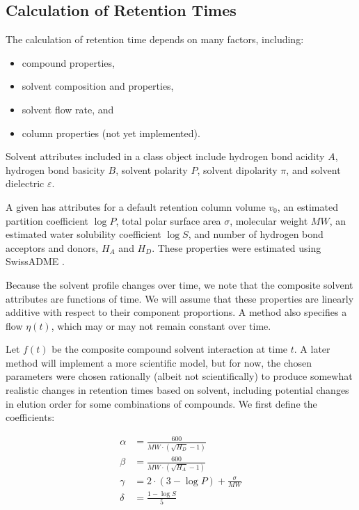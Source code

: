 \documentclass{article}
\newcommand{\cbtt}[1]{\textcolor{codepurple}{\fontseries{b}\selectfont{\texttt{#1}}}}
\begin{document}
\subsection{Calculation of Retention Times}\label{sec:calcret}
The calculation of retention time depends on many factors, including:
\begin{itemize}
\item compound properties,
\item solvent composition and properties,
\item solvent flow rate, and
\item column properties (not yet implemented).
\end{itemize}

Solvent attributes included in a \cbtt{Solvent} class object include hydrogen bond acidity $A$, hydrogen bond basicity $B$, solvent polarity $P$, solvent dipolarity $\pi$, and solvent dielectric $\varepsilon$. 

A given \cbtt{Compound} has attributes for a default retention column volume $v_0$, an estimated partition coefficient $\log P$, total polar surface area $\sigma$, molecular weight $MW$, an estimated water solubility coefficient $\log S$, and number of hydrogen bond acceptors and donors, $H_A$ and $H_D$. These properties were estimated using SwissADME \cite{swissadme}.

Because the solvent profile  changes over time, we note that the composite solvent attributes are functions of time. We will assume that these properties are linearly additive with respect to their component proportions. A method also specifies a flow $\eta(t)$, which may or may not remain constant over time.

Let $f(t)$ be the composite compound solvent interaction at time $t$. A later method will implement a more scientific model, but for now, the chosen parameters were chosen rationally (albeit not scientifically) to produce somewhat realistic changes in retention times based on solvent, including potential changes in elution order for some combinations of compounds. We first define the coefficients:

\begin{align*}
\alpha &= \frac{600}{MW \cdot \left(\sqrt{H_D}-1\right)} \\
\beta &= \frac{600}{MW \cdot \left(\sqrt{H_A}-1\right)} \\
\gamma &= 2 \cdot (3 - \log P) + \frac{\sigma}{MW} \\
\delta &= \frac{1-\log S }{5}
\end{align*}
\end{document}
